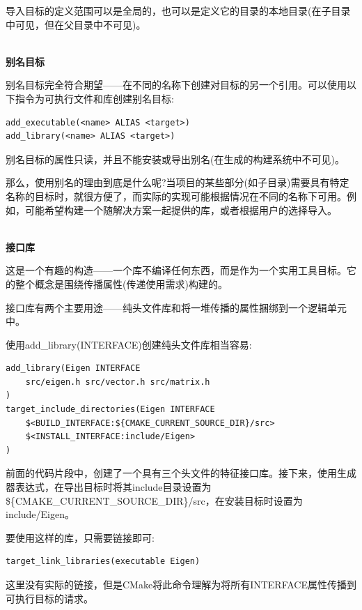 导入目标的定义范围可以是全局的，也可以是定义它的目录的本地目录(在子目录中可见，但在父目录中不可见)。

\hspace*{\fill} \\ %
\noindent
\textbf{别名目标}

别名目标完全符合期望——在不同的名称下创建对目标的另一个引用。可以使用以下指令为可执行文件和库创建别名目标:

\begin{lstlisting}[style=styleCMake]
add_executable(<name> ALIAS <target>)
add_library(<name> ALIAS <target>)
\end{lstlisting}

别名目标的属性只读，并且不能安装或导出别名(在生成的构建系统中不可见)。

那么，使用别名的理由到底是什么呢?当项目的某些部分(如子目录)需要具有特定名称的目标时，就很方便了，而实际的实现可能根据情况在不同的名称下可用。例如，可能希望构建一个随解决方案一起提供的库，或者根据用户的选择导入。

\hspace*{\fill} \\ %
\noindent
\textbf{接口库}

这是一个有趣的构造——一个库不编译任何东西，而是作为一个实用工具目标。它的整个概念是围绕传播属性(传递使用需求)构建的。

接口库有两个主要用途——纯头文件库和将一堆传播的属性捆绑到一个逻辑单元中。

使用add\_library(INTERFACE)创建纯头文件库相当容易:

\begin{lstlisting}[style=styleCMake]
add_library(Eigen INTERFACE
	src/eigen.h src/vector.h src/matrix.h
)
target_include_directories(Eigen INTERFACE
	$<BUILD_INTERFACE:${CMAKE_CURRENT_SOURCE_DIR}/src>
	$<INSTALL_INTERFACE:include/Eigen>
)
\end{lstlisting}

前面的代码片段中，创建了一个具有三个头文件的特征接口库。接下来，使用生成器表达式，在导出目标时将其include目录设置为\$\{CMAKE\_CURRENT\_SOURCE\_DIR\}/src，在安装目标时设置为include/Eigen。

要使用这样的库，只需要链接即可:

\begin{lstlisting}[style=styleCMake]
target_link_libraries(executable Eigen)
\end{lstlisting}

这里没有实际的链接，但是CMake将此命令理解为将所有INTERFACE属性传播到可执行目标的请求。

